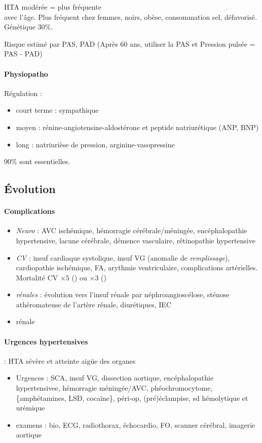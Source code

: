\documentclass{article}
\begin{document}
HTA modérée = plus fréquente\\
\inc avec l'âge. Plus fréquent chez femmes, noirs, obèse, consommation sel,
défavorisé. Génétique 30\%.

Risque estimé par PAS, PAD (Après 60 ans, utiliser la PAS et Pression pulsée = PAS - PAD)

\paragraph{Physiopatho}
Régulation :
\begin{itemize}
  \item court terme : sympathique 
  \item moyen : rénine-angiotensine-aldostérone et peptide natriurétique (ANP,
    BNP)
  \item long : natriurièse de pression, arginine-vasopressine
\end{itemize}

90\% sont essentielles.

\subsection{Évolution}
\paragraph{Complications}
\begin{itemize}
  \item 
\textit{Neuro}  : AVC ischémique, hémorragie cérébrale/méningée, encéphalopathie
hypertensive, lacune cérébrale, démence vasculaire, rétinopathie hypertensive
\item \textit{CV}  : insuf cardiaque systolique, insuf VG (anomalie de
  \textit{remplissage}), cardiopathie ischémique, FA, arythmie
  ventriculaire, complications artérielles. Mortalité CV $\times 5$ (\male) ou
  $\times 3$ (\female)
\item \textit{rénales} : évolution vers l'insuf rénale par néphroangioscélose,
  sténose athéromateuse de l'artère rénale, diurétiques, IEC
\item rénale
\end{itemize}

\paragraph{Urgences hypertensives} : HTA sévère et atteinte aigüe des organes
\begin{itemize}
  \item Urgences : SCA, insuf VG, dissection aortique, encéphalopathie
    hypertensivee, hémorragie méningée/AVC, phéochromocytome, \{amphétamines, 
    LSD, cocaïne\}, péri-op, (pré)éclampise, sd hémolytique et urémique
  \item examens : bio, ECG, radiothorax, échocardio, \gls{FO},
    scanner cérébral, imagerie aortique
\end{itemize}
\end{document}
